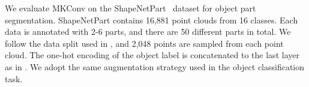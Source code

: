 \documentclass[preprint,12pt]{elsarticle}
\newcommand\Tstrut{\rule{-3pt}{2.6ex}}       \newcommand\Bstrut{\rule[-0.9ex]{-3pt}{0pt}} \newcommand{\TBstrut}{\rule{-3pt}{2.6ex} \rule[-0.9ex]{-2pt}{0pt}}  \usepackage{multirow}
\begin{document}
\begin{comment}
\begin{table*}[!b]
\Huge
	\begin{center}
		\resizebox{\linewidth}{!}{
			\begin{tabular}{l | c | c| *{16}{c}}
				\toprule
				Method & Input & mIoU & aero & bag & cap & car & chair & ear. & guit. & knife & lamp & lapt. & moto. & mug & pist. & rock. & skate. & table \\
				\midrule
				\midrule
				Kd-Net \cite{klokov2017escape} & 4k points & 	& 	& 	& 	& 	& 	& 	& 	& 	& 	& 	& 	& 	& 	& 	& 	& 	\Tstrut\\
				SynSpecCNN \cite{yi2017syncspeccnn}	& graph	& 	& 	& 	& 	& 	& 	& 	& 	& 	& 	& 	& 	& 	& 	& 	& 	& 	\\
				SO-Net  \cite{li2018so} 		& 1k points	&& 	& 	& 	& 	& 	& 	& 	& 	& 	& 	& 	& 	& 	& 	& 	& 	\\
				PointNet++ \cite{qi2017pointnet++} & 2k points	& 	& 	& 	& 	& 	& 	& 	& 	& 	& 	& 	& 	& 	& 	& 	& 	& 	\\
				DGCNN \cite{wang2019dynamic}		& 2k points&85.1	& 	& 	& 	& 	& 	& 	& 	& 	& 	& 	& 	& 	& 	& 	& 	& 	\\
				SpiderCNN \cite{xu2018spidercnn}		& 2k points &85.3	& 	& 	& 	& 	& 	& 	& 	& 	& 	& 	& 	& 	& 	& 	& 	& 	\\
				PointCNN \cite{li2018pointcnn}	& 2k points & 	& 	& 	& 	& 	& 	& 	& 	& 	& 	& 	& 	& 	& 	& 	& 	& 	\\
				RS-CNN \cite{liu2019relation} & 2k points  &&  && & & &&  && &&& & &&&\\
				KPConv \cite{thomas2019kpconv}	& 2k points & 	& 	& 	& 	& 	& 	& 	& 	& 	& 	& 	& 	& 	& 	& 	& 	& 	\\
				PAConv \cite{xu2021paconv} 	& 2k points	& 	& 	& 	& 	& 	& 	& 	& 	& 	& 	& 	& 	& 	& 	& 	&  & 	\Bstrut\\
				\bottomrule
				\midrule
				MKConv 	& 2k points	& 	& 	& 	& 	& 	& 	& 	& 	& 	& 	& 	& 	& 	& 	& 	&  & 	\\
				\bottomrule
		\end{tabular}}
	\end{center}
\vspace{-0.2cm}
\caption{Object part segmentation results on ShapeNetPart. The mean of instance-wise IoU (mIoU, \%) and class-wise IoU (\%) are reported.}
	\label{tab:psg} 
\end{table*}
\end{comment}




We evaluate MKConv on the ShapeNetPart~\citep{yi2016scalable} dataset for object part segmentation. ShapeNetPart contains 16,881 point clouds from 16 classes. Each data is annotated with 2-6 parts, and there are 50 different parts in total. We follow the data split used in \cite{qi2017pointnet}, and 2,048 points are sampled from each point cloud. The one-hot encoding of the object label is concatenated to the last layer as in \cite{qi2017pointnet}. We adopt the same augmentation strategy used in the object classification task. 
\end{document}
